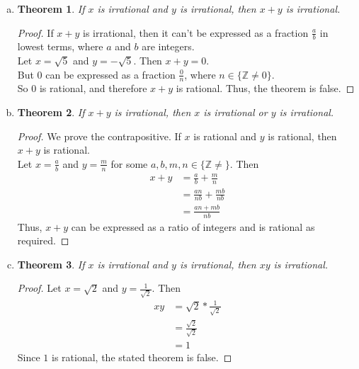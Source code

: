 \documentclass[12pt]{scrartcl} %
\newtheorem*{theorem}{Theorem}
\begin{document}
\begin{enumerate}[(a)]
\item \begin{theorem}
	If $x$ is irrational and $y$ is irrational, then $x + y$ is irrational.
	\end{theorem}
	
    	\begin{proof}
	If $x + y$ is irrational, then it can't be expressed as a fraction $\frac{a}{b}$ in lowest terms, where $a$ and $b$ are integers.\\
	Let $x = \sqrt{5}$ and $y = - \sqrt{5}$. Then $x + y = 0$.\\ But $0$ can be expressed as a fraction $\frac{0}{n}$, where $n \in \{\mathbb{Z} \neq 0\}$. \\So $0$ is rational, and therefore $x + y$ is rational. Thus, the theorem is false.
	\end{proof}
	
\item \begin{theorem}
If $x + y$ is irrational, then $x$ is irrational or $y$ is irrational.
\end{theorem}
\begin{proof}
We prove the contrapositive. If $x$ is rational and $y$ is rational, then $x + y$ is rational.\\
Let $x = \frac{a}{b}$ and $y = \frac{m}{n}$ for some $a, b, m, n \in \{\mathbb{Z} \neq\}$. Then \begin{align}
x + y &= \frac{a}{b} + \frac{m}{n} \\
&= \frac{an}{nb} + \frac{mb}{nb} \\
&= \frac{an + mb}{nb}
\end{align}
Thus, $x+y$ can be expressed as a ratio of integers and is rational as required.
\end{proof}
\item \begin{theorem}
If $x$ is irrational and $y$ is irrational, then $xy$ is irrational.
\end{theorem}
\begin{proof}
Let $x=\sqrt{2}$ and $y=\frac{1}{\sqrt{2}}$. Then \begin{align}
xy &= \sqrt{2} * \frac{1}{\sqrt{2}}\\
&= \frac{\sqrt{2}}{\sqrt{2}}\\
&= 1
\end{align}
Since $1$ is rational, the stated theorem is false.
\end{proof}


\end{enumerate}
\end{document}
